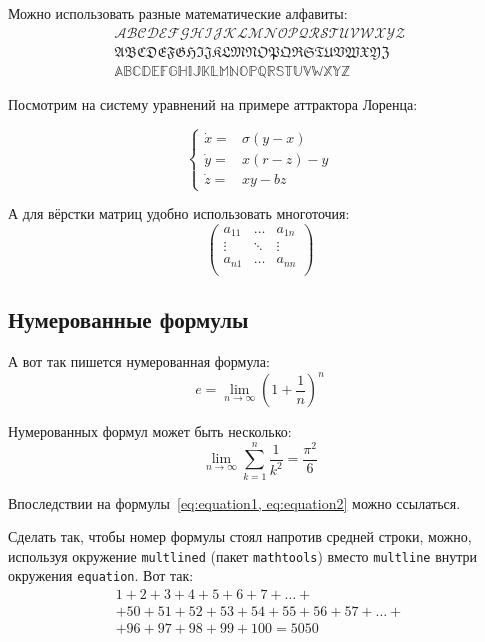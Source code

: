 Можно использовать разные математические алфавиты:
\begin{align}
\mathcal{ABCDEFGHIJKLMNOPQRSTUVWXYZ} \nonumber \\
\mathfrak{ABCDEFGHIJKLMNOPQRSTUVWXYZ} \nonumber \\
\mathbb{ABCDEFGHIJKLMNOPQRSTUVWXYZ} \nonumber
\end{align}

Посмотрим на систему уравнений на примере аттрактора Лоренца:

\[
\left\{
  \begin{array}{rl}
    \dot x = & \sigma (y-x) \\
    \dot y = & x (r - z) - y \\
    \dot z = & xy - bz
  \end{array}
\right.
\]

А для вёрстки матриц удобно использовать многоточия:
\[
\left(
  \begin{array}{ccc}
    a_{11} & \ldots & a_{1n} \\
    \vdots & \ddots & \vdots \\
    a_{n1} & \ldots & a_{nn} \\
  \end{array}
\right)
\]

\subsection{Нумерованные формулы}\label{subsec:ch1/sec3/sub3}

А вот так пишется нумерованная формула:
\begin{equation}
  \label{eq:equation1}
  e = \lim_{n \to \infty} \left( 1+\frac{1}{n} \right) ^n
\end{equation}

Нумерованных формул может быть несколько:
\begin{equation}
  \label{eq:equation2}
  \lim_{n \to \infty} \sum_{k=1}^n \frac{1}{k^2} = \frac{\pi^2}{6}
\end{equation}

Впоследствии на формулы~\cref{eq:equation1, eq:equation2} можно ссылаться.

Сделать так, чтобы номер формулы стоял напротив средней строки, можно,
используя окружение \verb|multlined| (пакет \verb|mathtools|) вместо
\verb|multline| внутри окружения \verb|equation|. Вот так:
\begin{equation} %
  \label{eq:equation3}
    \begin{multlined}
        1+ 2+3+4+5+6+7+\dots + \\
        + 50+51+52+53+54+55+56+57 + \dots + \\
        + 96+97+98+99+100=5050
    \end{multlined}
\end{equation}

